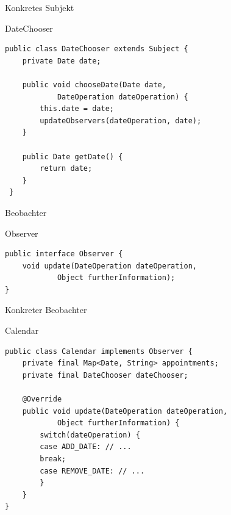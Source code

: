 \begin{frame}[fragile]{Konkretes Subjekt}
	\begin{exampleblock}{DateChooser}
 		\begin{lstlisting}
public class DateChooser extends Subject {
	private Date date;
	
	public void chooseDate(Date date, 
            DateOperation dateOperation) {
		this.date = date;
		updateObservers(dateOperation, date);
	}
	
	public Date getDate() {
		return date;
	}
 }
 		\end{lstlisting}
 	\end{exampleblock}
\end{frame}

\begin{frame}[fragile]{Beobachter}
	\begin{exampleblock}{Observer}
 		\begin{lstlisting}
public interface Observer {
	void update(DateOperation dateOperation, 
			Object furtherInformation);
}

 		\end{lstlisting}
 	\end{exampleblock}
\end{frame}

\begin{frame}[fragile]{Konkreter Beobachter}
	\begin{exampleblock}{Calendar}
 		\begin{lstlisting}
public class Calendar implements Observer {
	private final Map<Date, String> appointments;
	private final DateChooser dateChooser;

	@Override
	public void update(DateOperation dateOperation, 
			Object furtherInformation) {
		switch(dateOperation) {
		case ADD_DATE: // ...
		break;
		case REMOVE_DATE: // ...
		}
	}
} 		    
 		\end{lstlisting}
 	\end{exampleblock}
\end{frame}


